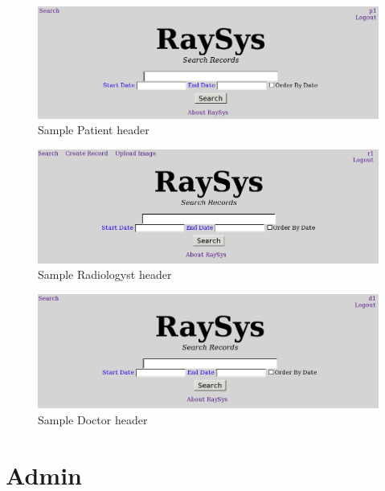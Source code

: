 \documentclass[11pt]{report}
\begin{document}
\begin{figure}[htb]
  \begin{center}
    \includegraphics[scale=0.50]{imgs/patientheader.png}
    \caption{Sample Patient header}
    \label{fig:patienth}
  \end{center}
\end{figure}

\begin{figure}[htb]
  \begin{center}
    \includegraphics[scale=0.50]{imgs/radioheader.png}
    \caption{Sample Radiologyst header}
    \label{fig:radioh}
  \end{center}
\end{figure}

\begin{figure}[htb]
  \begin{center}
    \includegraphics[scale=0.50]{imgs/doctorheader.png}
    \caption{Sample Doctor header}
    \label{fig:doch}
  \end{center}
\end{figure}


\chapter*{Admin}
\end{document}
